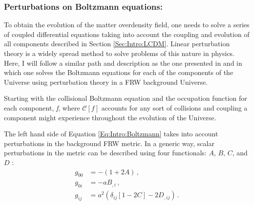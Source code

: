 \subsubsection{Perturbations on Boltzmann equations:}
To obtain the evolution of the matter overdensity field, one needs to solve a series of coupled differential equations taking into account the coupling and evolution of all components described in Section \ref{Sec:Intro:LCDM}. Linear perturbation theory is a widely spread method to solve problems of this nature in physics. Here, I will follow a similar path and description as the one presented in \cite{Peacock} and \cite{dods} in which one solves the Boltzmann equations for each of the components of the Universe using perturbation theory in a FRW background Universe. 

\qquad Starting with the collisional Boltzmann equation and the occupation function for each component, \textit{f}, 
where $\mathcal{C}[f]$ accounts for any sort of collisions and coupling a component might experience throughout the evolution of the Universe.

\qquad The left hand side of Equation \eqref{Eq:Intro:Boltzmann} takes into account perturbations in the background FRW metric. In a generic way, scalar perturbations in the metric can be described using four functionals: $A$, $B$, $C$, and $D$ \citep[][ p. 132]{dods}:
\begin{align}
    g_{00} & = -(1+2A)\, , \\
    g_{0i} & = -aB_{,i}\, , \\
    g_{ij} & = a^2\left( \delta_{ij} \left[ 1-2C \right] -2D_{,ij} \right)\, .
\end{align}

